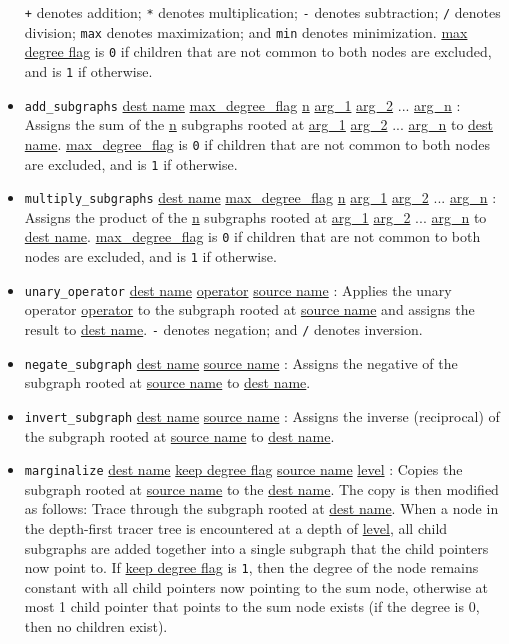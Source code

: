 \documentclass{article}
\begin{document}
\begin{itemize}
\texttt{+} denotes addition; \texttt{*} denotes multiplication; \texttt{-} denotes subtraction; \texttt{/} denotes division; \texttt{max} denotes maximization; and \texttt{min} denotes minimization.
\underline{max degree flag} is \texttt{0} if children that are not common to both nodes are excluded, and is \texttt{1} if otherwise.  
%
\item \texttt{add\_subgraphs} \underline{dest name} \underline{max\_degree\_flag} \underline{n} \underline{arg\_1} \underline{arg\_2} ... \underline{arg\_n} : Assigns the sum of the \underline{n} subgraphs rooted at \underline{arg\_1} \underline{arg\_2} ... \underline{arg\_n} to \underline{dest name}. \underline{max\_degree\_flag} is \texttt{0} if children that are not common to both nodes are excluded, and is \texttt{1} if otherwise.  
%
\item \texttt{multiply\_subgraphs} \underline{dest name} \underline{max\_degree\_flag} \underline{n} \underline{arg\_1} \underline{arg\_2} ... \underline{arg\_n} : Assigns the product of the \underline{n} subgraphs rooted at \underline{arg\_1} \underline{arg\_2} ... \underline{arg\_n} to \underline{dest name}. \underline{max\_degree\_flag} is \texttt{0} if children that are not common to both nodes are excluded, and is \texttt{1} if otherwise.  
% 
\item \texttt{unary\_operator} \underline{dest name} \underline{operator} \underline{source name} : Applies the unary operator \underline{operator} to the subgraph rooted at \underline{source name} and assigns the result to \underline{dest name}. 
\texttt{-} denotes negation; and \texttt{/} denotes inversion. 
%
\item \texttt{negate\_subgraph} \underline{dest name} \underline{source name} : Assigns the negative of the subgraph rooted at \underline{source name} to \underline{dest name}.
%
\item \texttt{invert\_subgraph} \underline{dest name} \underline{source name} : Assigns the inverse (reciprocal) of the subgraph rooted at \underline{source name} to \underline{dest name}.
%
\item \texttt{marginalize} \underline{dest name} \underline{keep degree flag} \underline{source name} \underline{level} : Copies the subgraph rooted at \underline{source name} to the \underline{dest name}. The copy is then modified as follows: Trace through the subgraph rooted at \underline{dest name}. When a node in the depth-first tracer tree is encountered at a depth of \underline{level}, all child subgraphs are added together into a single subgraph that the child pointers now point to. If \underline{keep degree flag} is \texttt{1}, then the degree of the node remains constant with all child pointers now pointing to the sum node, otherwise at most 1 child pointer that points to the sum node exists (if the degree is 0, then no children exist). 

\end{itemize}
\end{document}
